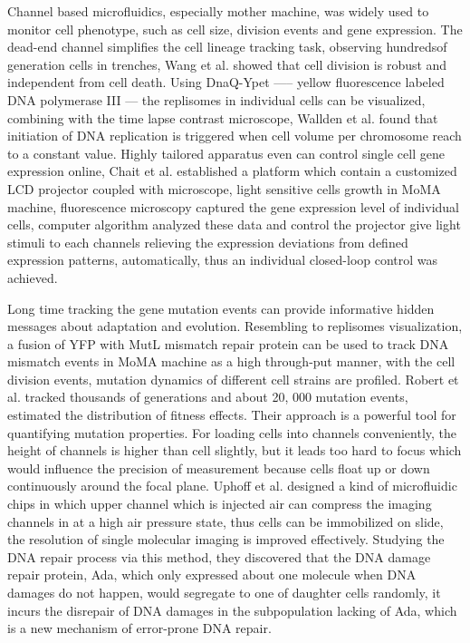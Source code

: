 \documentclass[fleqn,10pt]{wlscirep}
\begin{document}
Channel based microfluidics, especially mother machine, was widely used to monitor cell phenotype, such as cell size, division events and gene expression. The dead-end channel simplifies the cell lineage tracking task, observing hundredsof generation cells in trenches, Wang et al.\cite{Wang2010} showed that cell division is robust and independent from cell death. Using DnaQ-Ypet\cite{Sherratt2010} —– yellow fluorescence labeled DNA polymerase III — the replisomes in individual cells can be visualized, combining with the time lapse contrast microscope, Wallden et al.\cite{Wallden2016a} found that initiation of DNA replication is triggered when cell volume per chromosome reach to a constant value. Highly tailored apparatus even can control single cell gene expression online, Chait et al.\cite{Chait2017} established a platform which contain a customized LCD projector coupled with microscope, light sensitive cells growth in MoMA machine, fluorescence microscopy captured the gene expression level of individual cells, computer algorithm analyzed these data and control the projector give light stimuli to each channels relieving the expression deviations from defined expression patterns, automatically, thus an individual closed-loop control was achieved.

Long time tracking the gene mutation events can provide informative hidden messages about adaptation and evolution. Resembling to replisomes visualization, a fusion of YFP with MutL mismatch repair protein can be used to track DNA mismatch events in MoMA machine as a high through-put manner, with the cell division events, mutation dynamics of different cell strains are profiled. Robert et al.\cite{Robert2018} tracked thousands of generations and about 20, 000 mutation events, estimated the distribution of fitness effects. Their approach is a powerful tool for quantifying mutation properties. For loading cells into channels conveniently, the height of channels is higher than cell slightly, but it leads too hard to focus which would influence the precision of measurement because cells float up or down continuously around the focal plane. Uphoff et al.\cite{Robert2018a} designed a kind of microfluidic chips in which upper channel which is injected air can compress the imaging channels in at a high air pressure state, thus cells can be immobilized on slide, the resolution of single molecular imaging is improved effectively. Studying the DNA repair process via this method, they discovered that the DNA damage repair protein, Ada, which only expressed about one molecule when DNA damages do not happen, would segregate to one of daughter cells randomly, it incurs the disrepair of DNA damages in the subpopulation lacking of Ada, which is a new mechanism of error-prone DNA repair.
\end{document}

